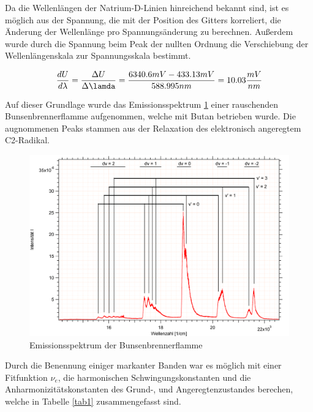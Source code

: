 


Da die Wellenlängen der Natrium-D-Linien hinreichend bekannt sind, ist es möglich aus der Spannung, die mit der Position des Gitters korreliert, die Änderung der Wellenlänge pro Spannungsänderung zu berechnen. Außerdem wurde durch die Spannung beim Peak der nullten Ordnung die Verschiebung der Wellenlängenskala zur Spannungsskala bestimmt.

\begin {equation}
\frac{dU}{d\lambda}=\frac{\Delta U}{\Delta\lamda}=\frac{6340.6 mV - 433.13 mV}{588.995 nm}=10.03 \frac{mV}{nm}
\end {equation}


Auf dieser Grundlage wurde das Emissionsspektrum \ref{Bunsen} einer rauschenden Bunsenbrennerflamme aufgenommen, welche mit Butan betrieben wurde. Die augnommenen Peaks stammen aus der Relaxation des elektronisch angeregtem C2-Radikal.



\begin{figure}[H]
	\centering	
	\begin{minipage}{1\textwidth}
	\includegraphics[width=\columnwidth]{Bilder/Graph3.png}
	\end{minipage}
	
	
	\caption{Emissionsspektrum der Bunsenbrennerflamme}
	

	\label{Bunsen}
\end{figure}

Durch die Benennung einiger markanter Banden war es möglich mit einer Fitfunktion $\nu_e$, die harmonischen Schwingungskonstanten und die Anharmonizitätskonstanten des Grund-, und Angeregtenzustandes berechen, welche in Tabelle  \ref{tab1} zusammengefasst sind.


